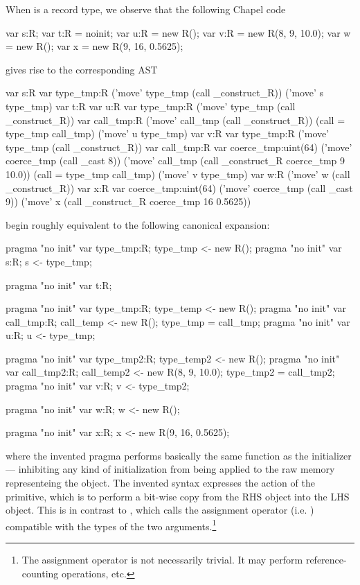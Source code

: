 When  is a record type, we observe that the following Chapel code
\begin{chapel}
  var s:R;
  var t:R = noinit;
  var u:R = new R();
  var v:R = new R(8, 9, 10.0);
  var w = new R();
  var x = new R(9, 16, 0.5625);
\end{chapel}
gives rise to the corresponding AST
\begin{chapelcode}
    var s:R
    {
      var type_tmp:R
      ('move' type_tmp (call _construct_R))
      ('move' s type_tmp)
    }
    var t:R
    var u:R
    {
      var type_tmp:R
      ('move' type_tmp (call _construct_R))
      var call_tmp:R
      ('move' call_tmp (call _construct_R))
      (call = type_tmp call_tmp)
      ('move' u type_tmp)
    }
    var v:R
    {
      var type_tmp:R
      ('move' type_tmp (call _construct_R))
      var call_tmp:R
      var coerce_tmp:uint(64)
      ('move' coerce_tmp (call _cast 8))
      ('move' call_tmp (call _construct_R coerce_tmp 9 10.0))
      (call = type_tmp call_tmp)
      ('move' v type_tmp)
    }
    var w:R
    ('move' w (call _construct_R))
    var x:R
    var coerce_tmp:uint(64)
    ('move' coerce_tmp (call _cast 9))
    ('move' x (call _construct_R coerce_tmp 16 0.5625))
\end{chapelcode}
begin roughly equivalent to the following canonical expansion:
\begin{chapel}
  pragma "no init" var type_tmp:R; type_tmp <- new R();
  pragma "no init" var s:R; s <- type_tmp;

  pragma "no init" var t:R;

  pragma "no init" var type_tmp:R; type_temp <- new R();
  pragma "no init" var call_tmp:R; call_temp <- new R();
  type_tmp = call_tmp;
  pragma "no init" var u:R; u <- type_tmp;

  pragma "no init" var type_tmp2:R; type_temp2 <- new R();
  pragma "no init" var call_tmp2:R; call_temp2 <- new R(8, 9, 10.0);
  type_tmp2 = call_tmp2;
  pragma "no init" var v:R; v <- type_tmp2;

  pragma "no init" var w:R; w <- new R();

  pragma "no init" var x:R; x <- new R(9, 16, 0.5625);
\end{chapel}
\noindent
where the invented pragma  performs basically the same function as the
 initializer --- inhibiting any kind of initialization from being applied
to the raw memory representeing the object.  The invented syntax \chpl{<-} expresses the
action of the  primitive, which is to perform a bit-wise copy from the RHS
object into the LHS object.  This is in contrast to \chpl{=}, which calls the assignment
operator (i.e. ) compatible with the types of the two arguments.\footnote{The
assignment operator is not necessarily trivial.  It may perform reference-counting
operations, etc.}

